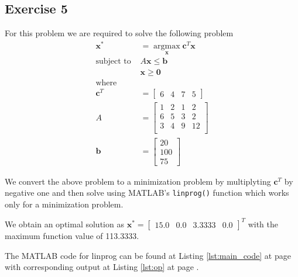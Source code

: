 \documentclass[11pt]{article}
\newcommand{\V}[1]{\pmb{#1}}
\newcommand{\mat}[1]{\begin{bmatrix}#1\end{bmatrix}}
\newcommand{\reflst}[1]{Listing \ref{#1} at page \pageref{#1}}
\begin{document}
\clearpage
\vspace{2ex}
\subsection*{Exercise 5} 
For this problem we are required to solve the following problem
\begin{align*}
 \V{x}^* &= \operatorname*{argmax}_{\V{x}} \V{c}^T\V{x}\\
 \text{subject to } &A\V{x} \leq \V{b}\\
 & \V{x}\geq \V{0}\\
 \text{where}\\
 \V{c}^T &= \mat{6 & 4 & 7& 5}\\
 A & = \mat{
 1& 2& 1 & 2\\
 6& 5& 3 & 2\\
 3& 4& 9 & 12\\
 }\\
 \V{b}& = \mat{20\\ 100\\ 75} 
\end{align*}

\noindent We convert the above problem to a minimization problem by multiplyting $\V{c}^T$ by negative one and then solve using MATLAB's \texttt{linprog()} function which works only for a minimization problem.

\noindent We obtain an optimal solution as $\V{x}^* = \mat{15.0 & 0.0& 3.3333& 0.0}^T$ with the maximum function value of 113.3333.

\noindent The MATLAB code for linprog can be found at \reflst{lst:main_code} with corresponding output at \reflst{lst:op}.

\newpage
\end{document}
